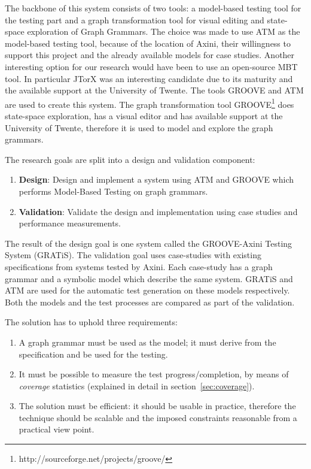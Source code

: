 The backbone of this system consists of two tools: a model-based testing tool for the testing part and a graph transformation tool for visual editing and state-space exploration of Graph Grammars. The choice was made to use ATM as the model-based testing tool, because of the location of Axini, their willingness to support this project and the already available models for case studies. Another interesting option for our research would have been to use an open-source MBT tool. In particular JTorX was an interesting candidate due to its maturity and the available support at the University of Twente. The tools GROOVE and ATM are used to create this system. The graph transformation tool GROOVE\footnote{http://sourceforge.net/projects/groove/} does state-space exploration, has a visual editor and has available support at the University of Twente, therefore it is used to model and explore the graph grammars.

The research goals are split into a design and validation component:
\begin{enumerate}
    \item \textbf{Design}: Design and implement a system using ATM and GROOVE which performs Model-Based Testing on graph grammars.
    \item \textbf{Validation}: Validate the design and implementation using case studies and performance measurements.
\end{enumerate}

The result of the design goal is one system called the GROOVE-Axini Testing System (GRATiS). The validation goal uses case-studies with existing specifications from systems tested by Axini. Each case-study has a graph grammar and a symbolic model which describe the same system. GRATiS and ATM are used for the automatic test generation on these models respectively. Both the models and the test processes are compared as part of the validation.

The solution has to uphold three requirements:
\begin{enumerate}
\item A graph grammar must be used as the model; it must derive from the specification and be used for the testing.
\item It must be possible to measure the test progress/completion, by means of \textit{coverage} statistics (explained in detail in section~\ref{sec:coverage}).
\item The solution must be efficient: it should be usable in practice, therefore the technique should be scalable and the imposed constraints reasonable from a practical view point.
\end{enumerate}

